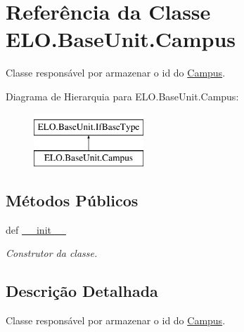 \hypertarget{classELO_1_1BaseUnit_1_1Campus}{\section{Referência da Classe E\-L\-O.\-Base\-Unit.\-Campus}
\label{classELO_1_1BaseUnit_1_1Campus}
}


Classe responsável por armazenar o id do \hyperlink{classELO_1_1BaseUnit_1_1Campus}{Campus}.  


Diagrama de Hierarquia para E\-L\-O.\-Base\-Unit.\-Campus\-:\begin{figure}[H]
\begin{center}
\leavevmode
\includegraphics[height=2.000000cm]{d4/d76/classELO_1_1BaseUnit_1_1Campus}
\end{center}
\end{figure}
\subsection*{Métodos Públicos}
\begin{DoxyCompactItemize}
\item 
def \hyperlink{classELO_1_1BaseUnit_1_1Campus_abd800984df4eb26836d305682d84dfa9}{\-\_\-\-\_\-init\-\_\-\-\_\-}
\begin{DoxyCompactList}\small\item\em Construtor da classe. \end{DoxyCompactList}\end{DoxyCompactItemize}


\subsection{Descrição Detalhada}
Classe responsável por armazenar o id do \hyperlink{classELO_1_1BaseUnit_1_1Campus}{Campus}. 



